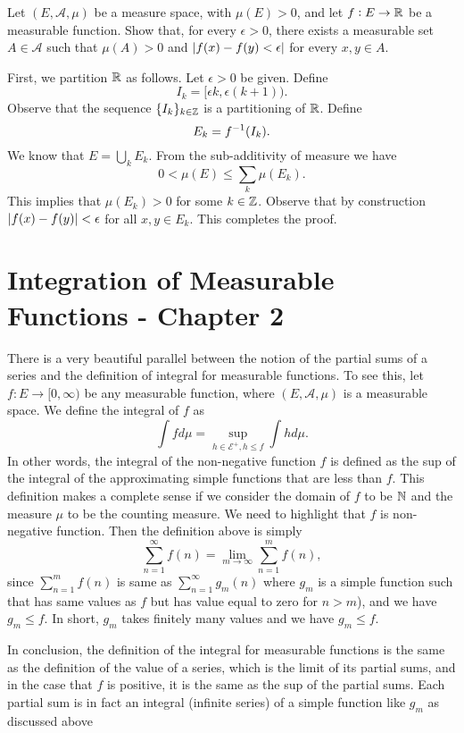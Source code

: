 \begin{problem}
	Let $ (E,\mathcal{A},\mu) $ be a measure space, with $ \mu(E) > 0 $, and let  $ f: E \to \mathbb{R} $ be a measurable function. Show that, for every $ \epsilon>0 $, there exists a measurable set $ A \in \mathcal{A} $ such that $ \mu(A) > 0 $ and $ |f(x) - f(y) < \epsilon| $ for every $ x,y \in A $.
\end{problem}
\begin{solution}
	First, we partition $ \mathbb{R} $ as follows. Let $ \epsilon>0 $ be given. Define
	\[ I_k = [\epsilon k, \epsilon(k+1)). \]
	Observe that the sequence $ \{I_k\}_{k\in \mathbb{Z}} $ is a partitioning of $ \mathbb{R} $. Define
	\[ E_k = f^{-1}(I_k). \]
	We know that $ E = \bigcup_k E_k $. From the sub-additivity of measure we have 
	\[ 0 < \mu(E) \leq \sum_k \mu(E_k). \]
	This implies that $ \mu(E_k) > 0 $ for some $ k \in \mathbb{Z} $. Observe that by construction $ |f(x) - f(y)| < \epsilon $ for all $ x,y \in E_k $. This completes the proof.
\end{solution}


\section{Integration of Measurable Functions - Chapter 2}

\begin{remark}
	There is a very beautiful parallel between the notion of the partial sums of a series and the definition of integral for measurable functions. To see this, let $ f: E \to [0,\infty) $ be any measurable function, where $ (E,\mathcal{A}, \mu) $ is a measurable space. We define the integral of $ f $ as 
	\[ \int f d\mu = \sup_{h\in\mathcal{E}^+, h\leq f} \int h d\mu. \]
	In other words, the integral of the non-negative function $ f $ is defined as the sup of the integral of the approximating simple functions that are less than $ f $. This definition makes a complete sense if we consider the domain of $ f $ to be $ \mathbb{N} $ and the measure $ \mu $ to be the counting measure. We need to highlight that $ f $ is non-negative function. Then the definition above is simply
	\[ \sum_{n=1}^{\infty}f(n) = \lim_{m\to\infty} \sum_{n=1}^m f(n), \]
	since $ \sum_{n=1}^{m} f(n) $ is same as $ \sum_{n=1}^{\infty} g_m(n) $ where $ g_m $ is a simple function such that has same values as $ f $ but has value equal to zero for $ n>m $), and we have $ g_m\leq f $. In short, $ g_m $ takes finitely many values and we have $ g_m\leq f $. 
	
	In conclusion, the definition of the integral for measurable functions is the same as the definition of the value of a series, which is the limit of its partial sums, and in the case that $ f $ is positive, it is the same as the sup of the partial sums. Each partial sum is in fact an integral (infinite series) of a simple function like $ g_m $ as discussed above
\end{remark}


